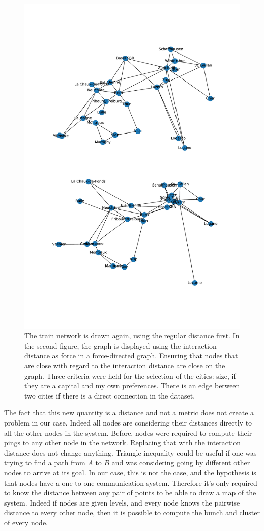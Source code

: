 \documentclass[a4paper,11pt,twoside=semi,openright]{report}
\begin{document}
\begin{figure}[!h] 
\centering
\includegraphics[width=350pt]{figures/CFF-NewDistances}
\caption{The train network is drawn again, using the regular distance first. In
    the second figure, the graph is displayed using the interaction distance as
    force in a force-directed graph. Ensuring that nodes that are close with
    regard to the interaction distance are close on the graph.  Three criteria
    were held for the selection of the cities: size, if they are a capital and
    my own preferences. There is an edge between two cities if there is a
    direct connection in the dataset.} \label{fig:CFF-NewDistances}
\end{figure}

The fact that this new quantity is a distance and not a metric does not create
a problem in our case. Indeed all nodes are considering their distances
directly to all the other nodes in the system. Before, nodes were required to
compute their pings to any other node in the network. Replacing that with the
interaction distance does not change anything. Triangle inequality could be
useful if one was trying to find a path from $A$ to $B$ and was considering
going by different other nodes to arrive at its goal. In our case, this is not
the case, and the hypothesis is that nodes have a one-to-one communication
system.  Therefore it's only required to know the distance between any pair of
points to be able to draw a map of the system. Indeed if nodes are given
levels, and every node knows the pairwise distance to every other node, then it
is possible to compute the bunch and cluster of every node.
\end{document}
